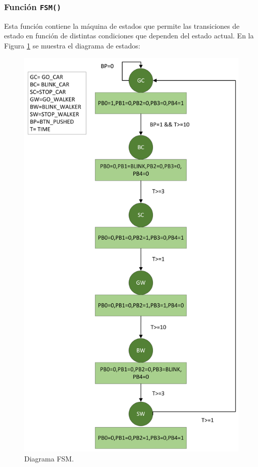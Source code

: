 \subsubsection{Función \texttt{FSM()}}
Esta función contiene la máquina de estados que permite las transiciones de estado en función de distintas condiciones que dependen del estado actual. En la Figura \ref{fig:FSMdiagram} se muestra el diagrama de estados:

\begin{figure}[H]
\centering
\includegraphics[scale=0.4]{./Figuras/Desarrollo_Analisis/Diagrama_Semaforo}
\caption{Diagrama FSM.}
\label{fig:FSMdiagram}
\end{figure}

